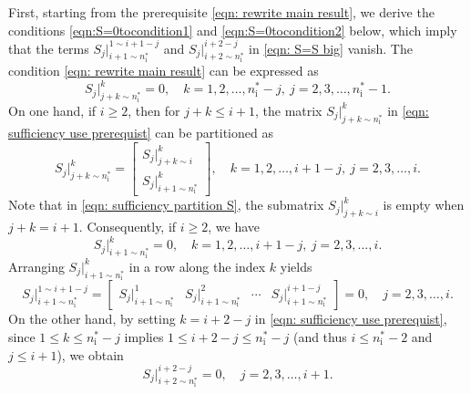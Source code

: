 \documentclass[sort&compress]{elsarticle}
\newcommand\nsharp{n_\mathrm i^*}
\begin{document}
First, starting from the prerequisite \eqref{eqn: rewrite main result},
we derive the conditions \eqref{eqn:S=0tocondition1} and \eqref{eqn:S=0tocondition2} below,
which imply that the terms $S_j|_{i+1\sim\nsharp}^{1\sim i+1-j}$
and $S_j|_{i+2\sim\nsharp}^{i+2-j}$ in \eqref{eqn: S=S big} vanish.
The condition \eqref{eqn: rewrite main result} can be expressed as
\begin{equation}\label{eqn: sufficiency use prerequist}
S_j|_{j+k\sim\nsharp}^k = 0, \quad k = 1, 2, \dots, \nsharp-j, \ j = 2, 3, \dots, \nsharp-1.
\end{equation}
On one hand, if $i \ge 2$, then for $j+k \le i+1$,
the matrix $S_j|_{j+k\sim\nsharp}^k$ in \eqref{eqn: sufficiency use prerequist}
can be partitioned as
\begin{equation}\label{eqn: sufficiency partition S}
S_j|_{j+k\sim\nsharp}^k =
\begin{bmatrix}
S_j|_{j+k\sim i}^k \\
S_j|_{i+1\sim\nsharp}^k
\end{bmatrix},
\quad
k = 1, 2, \dots, i+1-j, \
j = 2, 3, \dots, i.
\end{equation}
Note that in \eqref{eqn: sufficiency partition S},
the submatrix $S_j|_{j+k\sim i}^k$ is empty when $j+k = i+1$.
Consequently, if $i \ge 2$, we have
\[
S_j|_{i+1\sim\nsharp}^k = 0,
\quad
k = 1, 2, \dots, i+1-j, \
j = 2, 3, \dots, i.
\]
Arranging $S_j|_{i+1\sim\nsharp}^k$ in a row along the index $k$ yields
\begin{equation}\label{eqn:S=0tocondition1}
S_j|_{i+1\sim\nsharp}^{1\sim i+1-j}
= \begin{bmatrix}
S_j|_{i+1\sim\nsharp}^1 & S_j|_{i+1\sim\nsharp}^2 & \cdots & S_j|_{i+1\sim\nsharp}^{i+1-j}
\end{bmatrix}
= 0,
\quad j = 2, 3, \dots, i.
\end{equation}
On the other hand, by setting $k = i+2-j$ in \eqref{eqn: sufficiency use prerequist},
since $1 \le k \le \nsharp-j$ implies $1 \le i+2-j \le \nsharp-j$
(and thus $i \le \nsharp-2$ and $j \le i+1$), we obtain
\begin{equation}\label{eqn:S=0tocondition2}
S_j|_{i+2\sim\nsharp}^{i+2-j} = 0,
\quad j = 2, 3, \dots, i+1.
\end{equation}
\end{document}
